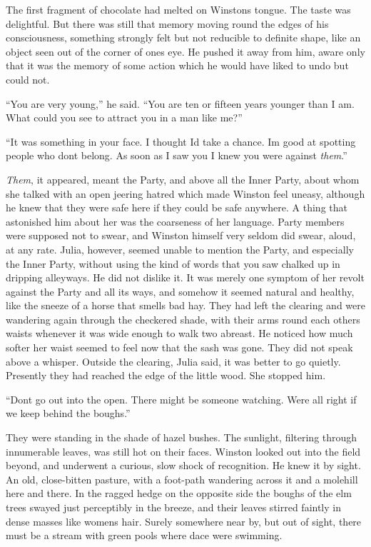 The first fragment of chocolate had melted on Winston\textquotesingle s
tongue. The taste was delightful. But there was still that memory moving
round the edges of his consciousness, something strongly felt but not
reducible to definite shape, like an object seen out of the corner of
one\textquotesingle s eye. He pushed it away from him, aware only that
it was the memory of some action which he would have liked to undo but
could not.

``You are very young,'' he said. ``You are ten or fifteen years younger
than I am. What could you see to attract you in a man like me?''

``It was something in your face. I thought I\textquotesingle d take a
chance. I\textquotesingle m good at spotting people who
don\textquotesingle t belong. As soon as I saw you I knew you were
against \emph{them}.''

\emph{Them}, it appeared, meant the Party, and above all the Inner
Party, about whom she talked with an open jeering hatred which made
Winston feel uneasy, although he knew that they were safe here if they
could be safe anywhere. A thing that astonished him about her was the
coarseness of her language. Party members were supposed not to swear,
and Winston himself very seldom did swear, aloud, at any rate. Julia,
however, seemed unable to mention the Party, and especially the Inner
Party, without using the kind of words that you saw chalked up in
dripping alleyways. He did not dislike it. It was merely one symptom of
her revolt against the Party and all its ways, and somehow it seemed
natural and healthy, like the sneeze of a horse that smells bad hay.
They had left the clearing and were wandering again through the
checkered shade, with their arms round each other\textquotesingle s
waists whenever it was wide enough to walk two abreast. He noticed how
much softer her waist seemed to feel now that the sash was gone. They
did not speak above a whisper. Outside the clearing, Julia said, it was
better to go quietly. Presently they had reached the edge of the little
wood. She stopped him.

``Don\textquotesingle t go out into the open. There might be someone
watching. We\textquotesingle re all right if we keep behind the boughs.''

They were standing in the shade of hazel bushes. The sunlight, filtering
through innumerable leaves, was still hot on their faces. Winston looked
out into the field beyond, and underwent a curious, slow shock of
recognition. He knew it by sight. An old, close-bitten pasture, with a
foot-path wandering across it and a molehill here and there. In the
ragged hedge on the opposite side the boughs of the elm trees swayed
just perceptibly in the breeze, and their leaves stirred faintly in
dense masses like women\textquotesingle s hair. Surely somewhere near
by, but out of sight, there must be a stream with green pools where dace
were swimming.

